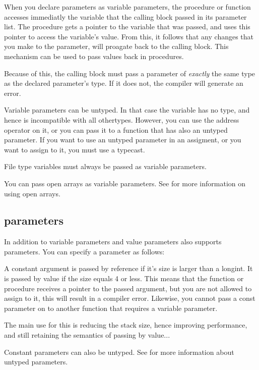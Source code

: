 \documentclass{report}
\begin{document}


When you declare parameters as variable parameters, the procedure or
function accesses immediatly the variable that the calling block passed in
its parameter list. The procedure gets a pointer to the variable that was
passed, and uses this pointer to access the variable's value.
From this, it follows that any changes that you make to the parameter, will
proagate back to the calling block. This mechanism can be used to pass
values back in procedures.

Because of this, the calling block must pass a parameter of {\em exactly}
the same type as the declared parameter's type. If it does not, the compiler
will generate an error.

Variable parameters can be untyped. In that case the variable has no type,
and hence is incompatible with all othertypes. However, you can use the 
address operator on it, or you can pass it to a function that has also an 
untyped parameter. If you want to use an untyped parameter in an assigment,
or you want to assign to it, you must use a typecast.

File type variables must always be passed as variable parameters.

You can pass open arrays as variable parameters. See  for
more information on using open arrays.

\subsection{ parameters}

In addition to variable parameters and value parameters \fpc also supports 
 parameters. You can specify a  parameter as follows:



A constant argument is passed by reference if it's size is larger than a
longint. It is passed by value if the size equals 4 or less.
This means that the function or procedure receives a pointer to the passed 
argument, but you are not allowed to assign to it, this will result in a 
compiler error. Likewise, you cannot pass a const parameter on to another
function that requires a variable parameter.

The main use for this is reducing the stack size, hence improving
performance, and still retaining the semantics of passing by value...

Constant parameters can also be untyped. See  for more
information about untyped parameters.
\end{document}
